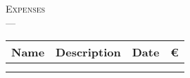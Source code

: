 \documentclass[12pt]{article}
\begin{document}

\begin{center}
  \large
  \textsc{Expenses}\\
  \small
  \textbf{} --- \textbf{}\\[0.5cm]

  \small
  \begin{tabular}{|K{4.0cm}|K{7.5cm}|K{2.5cm}|K{1.5cm}|}
    \hline
    \textbf{Name} & \textbf{Description} & \textbf{Date} & \euro \\ \hline
    \hline
      & & & \\[0.25cm] \hline
  \end{tabular}
\end{center}
\end{document}
